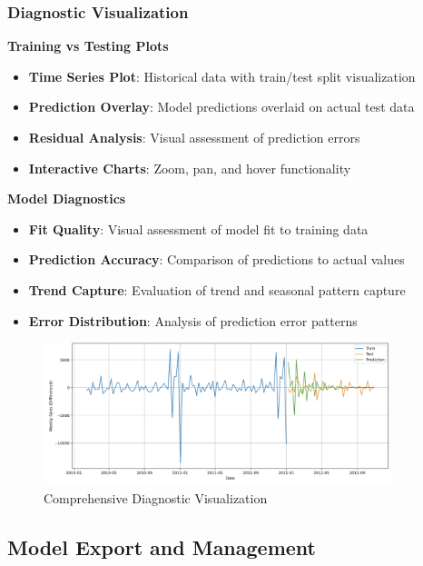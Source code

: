 \subsubsection{Diagnostic Visualization}

\textbf{Training vs Testing Plots}
\begin{itemize}
	\item \textbf{Time Series Plot}: Historical data with train/test split visualization
	\item \textbf{Prediction Overlay}: Model predictions overlaid on actual test data
	\item \textbf{Residual Analysis}: Visual assessment of prediction errors
	\item \textbf{Interactive Charts}: Zoom, pan, and hover functionality
\end{itemize}

\textbf{Model Diagnostics}
\begin{itemize}
	\item \textbf{Fit Quality}: Visual assessment of model fit to training data
	\item \textbf{Prediction Accuracy}: Comparison of predictions to actual values
	\item \textbf{Trend Capture}: Evaluation of trend and seasonal pattern capture
	\item \textbf{Error Distribution}: Analysis of prediction error patterns
\end{itemize}

\begin{figure}[H]
	\centering
	\includegraphics[width=0.9\textwidth]{Images/05ApplicationFunctionsAndFeatures/DiagnosticPlots.png}
	\caption{Comprehensive Diagnostic Visualization}
	\label{fig:diagnostic_plots}
\end{figure}

\subsection{Model Export and Management}

